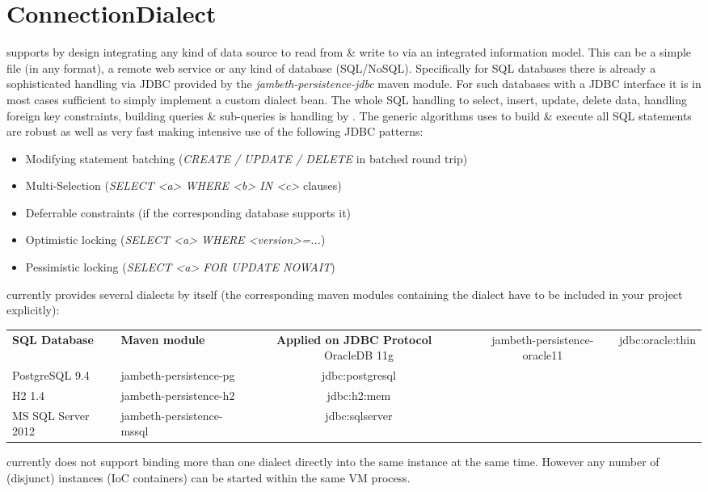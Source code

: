 \section{ConnectionDialect}
\label{feature:ConnectionDialect}
\ClearAPI

\AMBETH{} supports by design integrating any kind of data source to read from \& write to via an integrated information model. This can be a simple file (in any format), a remote web service or any kind of database (SQL/NoSQL). Specifically for SQL databases there is already a sophisticated handling via JDBC provided by the \textit{jambeth-persistence-jdbc} maven module. For such databases with a JDBC interface it is in most cases sufficient to simply implement a custom dialect bean. The whole SQL handling to select, insert, update, delete data, handling foreign key constraints, building queries \& sub-queries is handling by \AMBETH{}. The generic algorithms \AMBETH{} uses to build \& execute all SQL statements are robust as well as very fast making intensive use of the following JDBC patterns:

\begin{itemize}
	\item Modifying statement batching (\textit{CREATE / UPDATE / DELETE} in batched round trip)
	\item Multi-Selection (\textit{SELECT <a> WHERE <b> IN <c>} clauses)
	\item Deferrable constraints (if the corresponding database supports it)
	\item Optimistic locking (\textit{SELECT <a> WHERE <version>=...})
	\item Pessimistic locking (\textit{SELECT <a> FOR UPDATE NOWAIT})
\end{itemize}

\AMBETH{} currently provides several dialects by itself (the corresponding maven modules containing the dialect have to be included in your project explicitly):

\begin{longtable}{ l l c c c } \hline \textbf{SQL Database} & \textbf{Maven module} & \textbf{Applied on JDBC Protocol} \
	\endhead
	\hline
		OracleDB 11g				&	jambeth-persistence-oracle11	&	jdbc:oracle:thin	\\
		PostgreSQL 9.4			&	jambeth-persistence-pg				&	jdbc:postgresql		\\
		H2 1.4							& jambeth-persistence-h2				& jdbc:h2:mem				\\
		MS SQL Server 2012	& jambeth-persistence-mssql			& jdbc:sqlserver		\\
	\hline
\end{longtable}

\AMBETH{} currently does not support binding more than one dialect directly into the same \AMBETH{} instance at the same time. However any number of (disjunct) \AMBETH{} instances (IoC containers) can be started within the same VM process.